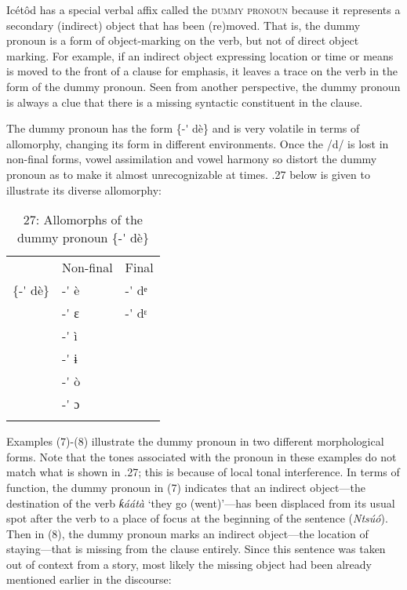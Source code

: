 Icétôd has a special verbal affix called the \textsc{dummy pronoun} because it represents a secondary (indirect) object that has been (re)moved. That is, the dummy pronoun is a form of object-marking on the verb, but not of direct object marking. For example, if an indirect object expressing location or time or means is moved to the front of a clause for emphasis, it leaves a trace on the verb in the form of the dummy pronoun. Seen from another perspective, the dummy pronoun is always a clue that there is a missing syntactic constituent in the clause.

The dummy pronoun has the form \{-\'{} dè\} and is very volatile in terms of allomorphy, changing its form in different environments. Once the /d/ is lost in non-final forms, vowel assimilation and vowel harmony so distort the dummy pronoun as to make it almost unrecognizable at times. .27 below is given to illustrate its diverse allomorphy:


\begin{table}
\caption{27: Allomorphs of the dummy pronoun \{-\'{} dè\}}
\label{tab:8}


\begin{tabularx}{\textwidth}{XXX} & Non-final & Final\\
\lsptoprule
\{-\'{} dè\} & {}-\'{} è & {}-\'{} dᵉ\\
& {}-\'{} ɛ & {}-\'{} dᵋ\\
& {}-\'{} ì & \\
& {}-\'{} ɨ & \\
& {}-\'{} ò & \\
& {}-\'{} ɔ & \\
\lspbottomrule
\end{tabularx}
\end{table}
Examples (7)-(8) illustrate the dummy pronoun in two different morphological forms. Note that the tones associated with the pronoun in these examples do not match what is shown in .27; this is because of local tonal interference. In terms of function, the dummy pronoun in (7) indicates that an indirect object—the destination of the verb \textit{ƙáátà} ‘they go (went)’—has been displaced from its usual spot after the verb to a place of focus at the beginning of the sentence (\textit{Ntsúó}). Then in (8), the dummy pronoun marks an indirect object—the location of staying—that is missing from the clause entirely. Since this sentence was taken out of context from a story, most likely the missing object had been already mentioned earlier in the discourse:




